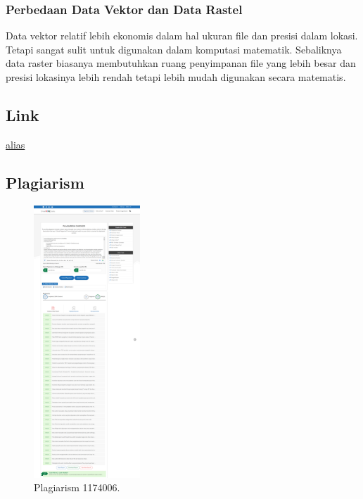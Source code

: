 \subsubsection{Perbedaan Data Vektor dan Data Rastel}
Data vektor relatif lebih ekonomis dalam hal ukuran file dan presisi dalam lokasi. Tetapi sangat sulit untuk digunakan dalam komputasi matematik. Sebaliknya data raster biasanya membutuhkan ruang penyimpanan file yang lebih besar dan presisi lokasinya lebih rendah tetapi lebih mudah digunakan secara matematis.

\subsection{Link}
\href{link kamu}{alias}

\subsection{Plagiarism}
\begin{figure}[H]
	\includegraphics[width=4cm]{figures/1174006/1174006plagiarism1.png}
	\centering
	\caption{Plagiarism 1174006.}
\end{figure}
